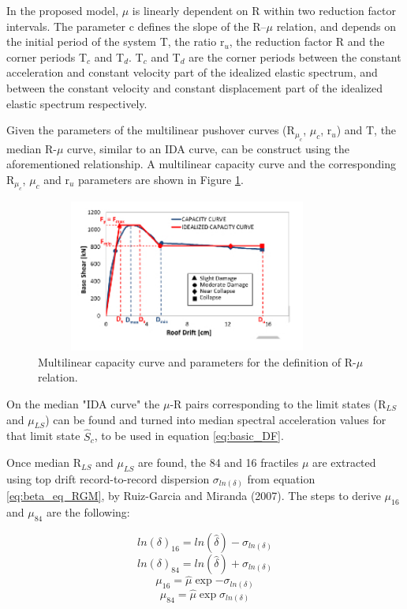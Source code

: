 In the proposed model, $\mu$ is linearly dependent on R within two reduction factor intervals. The parameter c defines the slope of the R–$\mu$ relation, and depends on the initial period of the system T, the ratio r$_{u}$, the reduction factor R and the corner periods T$_{c}$ and T$_{d}$. T$_{c}$ and T$_{d}$ are the corner periods between the constant acceleration and constant velocity part of the idealized elastic spectrum, and between the constant velocity and constant displacement part of the idealized elastic spectrum respectively.

Given the parameters of the multilinear pushover curves (R$_{\mu_{c}}$, $\mu_{c}$, r$_{u}$) and T, the median R-$\mu$ curve, similar to an IDA curve, can be construct using the aforementioned relationship.  A multilinear capacity curve and the corresponding R$_{\mu_{c}}$, $\mu_{c}$ and r$_{u}$ parameters are shown in Figure \ref{fig:quadrilinear_DF}.

\begin{figure}[H]
\centering
\includegraphics[width=10cm,height=5cm]{./figures/quadrilinearDF.jpg}
\caption{Multilinear capacity curve and parameters for the definition of R-$\mu$ relation.}
\label{fig:quadrilinear_DF}
\end{figure}

On the median "IDA curve" the $\mu$-R pairs corresponding to the limit states (R$_{LS}$ and $\mu_{LS}$) can be found and turned into median spectral acceleration values for that limit state $\hat{S}_c$, to be used in equation \ref{eq:basic_DF}.

Once median R$_{LS}$ and $\mu_{LS}$ are found, the 84 and 16 fractiles $\mu$ are extracted using top drift record-to-record dispersion $\sigma_{ln(\delta)}$ from equation \ref{eq:beta_eq_RGM}, by Ruiz-Garcia and Miranda (2007). The steps to derive $\mu_{16}$ and $\mu_{84}$ are the following:
 
\begin{equation}
ln(\delta)_{16} = ln(\hat{\delta})-\sigma_{ln(\delta)}
\end{equation}
\begin{equation}
ln(\delta)_{84} = ln(\hat{\delta})+\sigma_{ln(\delta)}
\end{equation}
\begin{equation}
\mu_{16} = \hat{\mu} \exp{-\sigma_{ln(\delta)}}
\end{equation}
\begin{equation}
\mu_{84} = \hat{\mu} \exp{\sigma_{ln(\delta)}}
\end{equation}

